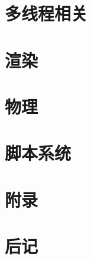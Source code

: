 \documentclass[
    UTF8,       %
    b5paper,    %
    10pt,       %
    oneside,    %
    openright,  %
    titlepage,  %
    final       %
]{ctexbook}
\begin{document}
    \chapter{多线程相关}

    \maketitle
    \chapter{渲染}

    \maketitle
    \chapter{物理}

    \maketitle
    \chapter{脚本系统}

    \appendix
    \maketitle
    \chapter{附录}


    \backmatter
    \chapter{后记}

\end{document}

